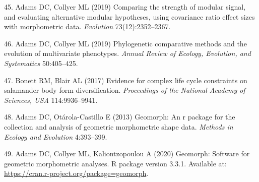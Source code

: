 \documentclass[9pt,twocolumn,twoside,lineno]{pnas-new}
\begin{document}
\leavevmode\hypertarget{ref-AdamsCollyer2019b}{}%
45. Adams DC, Collyer ML (2019) Comparing the strength of modular
signal, and evaluating alternative modular hypotheses, using covariance
ratio effect sizes with morphometric data. \emph{Evolution}
73(12):2352--2367.

\leavevmode\hypertarget{ref-AdamsCollyer2019}{}%
46. Adams DC, Collyer ML (2019) Phylogenetic comparative methods and the
evolution of multivariate phenotypes. \emph{Annual Review of Ecology,
Evolution, and Systematics} 50:405--425.

\leavevmode\hypertarget{ref-Bonett2017}{}%
47. Bonett RM, Blair AL (2017) Evidence for complex life cycle
constraints on salamander body form diversification. \emph{Proceedings
of the National Academy of Sciences, USA} 114:9936--9941.

\leavevmode\hypertarget{ref-AdamsOtarola2013}{}%
48. Adams DC, Otárola-Castillo E (2013) Geomorph: An r package for the
collection and analysis of geometric morphometric shape data.
\emph{Methods in Ecology and Evolution} 4:393--399.

\leavevmode\hypertarget{ref-AdamsGeomorph}{}%
49. Adams DC, Collyer ML, Kaliontzopoulou A (2020) Geomorph: Software
for geometric morphometric analyses. R package version 3.3.1. Available
at: \url{https://cran.r-project.org/package=geomorph}.



% 
\end{document}
